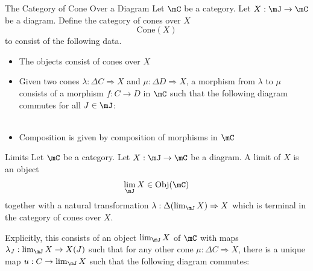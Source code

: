 \documentclass[a4paper]{article}
\begin{document}
\begin{defn}{The Category of Cone Over a Diagram}{} Let $\mC$ be a category. Let $X:\mJ\to\mC$ be a diagram. Define the category of cones over $X$ $$\text{Cone}(X)$$ to consist of the following data. 
\begin{itemize}
\item The objects consist of cones over $X$
\item Given two cones $\lambda:\Delta C\Rightarrow X$ and $\mu:\Delta D\Rightarrow X$, a morphism from $\lambda$ to $\mu$ consists of a morphism $f:C\to D$ in $\mC$ such that the following diagram commutes for all $J\in\mJ$: \\
\\
\item Composition is given by composition of morphisms in $\mC$
\end{itemize}
\end{defn}

\begin{defn}{Limits}{} Let $\mC$ be a category. Let $X:\mJ\to\mC$ be a diagram. A limit of $X$ is an object $$\lim_\mJ X\in\text{Obj}(\mC)$$ together with a natural transformation $\lambda:\Delta(\lim_\mJ X)\Rightarrow X$ which is terminal in the category of cones over $X$. 
\end{defn}

Explicitly, this consists of an object $\lim_\mJ X$ of $\mC$ with maps $\lambda_J:\lim_\mJ X\to X(J)$ such that for any other cone $\mu:\Delta C\Rightarrow X$, there is a unique map $u:C\to\lim_\mJ X$ such that the following diagram commutes: \\
\\
\end{document}
